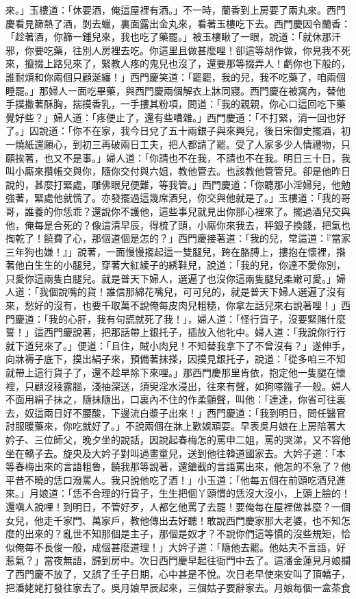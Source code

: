 \begin{showcontents}{}
來。」玉樓道：「休要酒，俺這屋裡有酒。」不一時，蘭香到上房要了兩丸來。西門慶看見篩熱了酒，剝去蠟，裏面露出金丸來，看著玉樓吃下去。西門慶因令蘭香：「趁著酒，你篩一鍾兒來，我也吃了藥罷。」被玉樓瞅了一眼，說道：「就休那汗邪，你要吃藥，往別人房裡去吃。你這里且做甚麼哩！卻這等胡作做，你見我不死來，攛掇上路兒來了，緊教人疼的鬼兒也沒了，還要那等掇弄人！虧你也下般的，誰耐煩和你兩個只顧涎纏！」西門慶笑道：「罷罷，我的兒，我不吃藥了，咱兩個睡罷。」那婦人一面吃畢藥，與西門慶兩個解衣上牀同寢。西門慶在被窩內，替他手撲撒著酥胸，揣摸香乳，一手摟其粉項，問道：「我的親親，你心口這回吃下藥覺好些？」婦人道：「疼便止了，還有些嘈雜。」西門慶道：「不打緊，消一回也好了。」囚說道：「你不在家，我今日兌了五十兩銀子與來興兒，後日宋御史擺酒，初一燒紙還願心，到初三再破兩日工夫，把人都請了罷。受了人家多少人情禮物，只願挨著，也又不是事。」婦人道：「你請也不在我，不請也不在我。明日三十日，我叫小廝來攢帳交與你，隨你交付與六姐，教他管去。也該教他管管兒。卻是他昨日說的，甚麼打緊處，雕佛眼兒便難，等我管。」西門慶道：「你聽那小淫婦兒，他勉強著，緊處他就慌了。亦發擺過這幾席酒兒，你交與他就是了。」玉樓道：「我的哥哥，誰養的你恁乖？還說你不護他，這些事兒就見出你那心裡來了。擺過酒兒交與他，俺每是合死的？像這清早辰，得梳了頭，小廝你來我去，秤銀子換錢，把氣也掏乾了！饒費了心，那個道個是怎的？」西門慶接著道：「我的兒，常這道：『當家三年狗也嫌！』」說著，一面慢慢搊起這一雙腿兒，跨在胳膊上，摟抱在懷裡，揝著他白生生的小腿兒，穿著大紅綾子的綉鞋兒，說道：「我的兒，你達不愛你別，只愛你這兩隻白腿兒。就是普天下婦人，選遍了也沒你這兩隻腿兒柔嫩可愛。」婦人道：「我個說嘴的貨！誰信那綿花嘴兒，可可兒的，就是普天下婦人選遍了沒有來，愁好的沒有，也要千取萬不說俺每皮肉兒粗糙，你拿左話兒來右說著哩！」西門慶道：「我的心肝，我有句謊就死了我！」，婦人道：「怪行貨子，沒要緊賭什麼誓！」這西門慶說著，把那話帶上銀托子，插放入他牝中。婦人道：「我說你行行就下道兒來了。」便道：「且住，賊小肉兒！不知替我拿下了不曾沒有？」遂伸手，向牀褥子底下，摸出絹子來，預備著抹搽，因摸見銀托子，說道：「從多咱三不知就帶上這行貨子了，還不趁早除下來哩。」那西門慶那里肯依，抱定他一隻腿在懷裡，只顧沒稜露腦，淺抽深送，須臾淫水浸出，往來有聲，如狗嗏鏹子一般。婦人不面用絹子抹之，隨抹隨出，口裏內不住的作柔顫聲，叫他：「達達，你省可往裏去，奴這兩日好不腰酸，下邊流白漿子出來！」西門慶道：「我到明日，問任醫官討服暖藥來，你吃就好了。」不說兩個在牀上歡娛頑耍。早表吳月娘在上房陪著大妗子、三位師父，晚夕坐的說話，因說起春梅怎的罵申二姐，罵的哭涕，又不容他坐在轎子去。旋央及大妗子對叫過畫童兒，送到他往韓道國家去。大妗子道：「本等春梅出來的言語粗魯，饒我那等說著，還鎗截的言語罵出來，他怎的不急了？他平昔不曉的恁口潑罵人。我只說他吃了酒！」小玉道：「他每五個在前頭吃酒兒進來。」月娘道：「恁不合理的行貨子，生生把個丫頭慣的恁沒大沒小，上頭上臉的！還嗔人說哩！到明日，不管好歹，人都乞他罵了去罷！要俺每在屋裡做甚麼？一個女兒，他走千家門、萬家戶，教他傳出去好聽！敢說西門慶家那大老婆，也不知怎麼的出來的？亂世不知那個是主子，那個是奴才？不說你們這等慣的沒些規矩，恰似俺每不長俊一般，成個甚麼道理！」大妗子道：「隨他去罷。他姑夫不言語，好惹氣？」當夜無語，歸到房中。次日西門慶早起往衙門中去了。這潘金蓮見月娘攔了西門慶不放了，又誤了壬子日期，心中甚是不悅。次日老早使來安叫了頂轎子，把潘姥姥打發往家去了。吳月娘早辰起來，三個姑子要辭家去。月娘每個一盒茶食
\end{showcontents}
